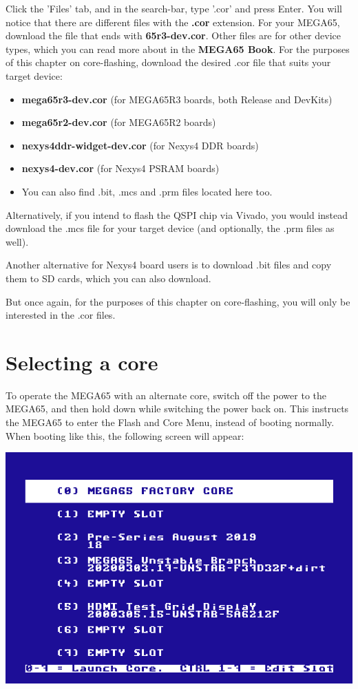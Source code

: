 Click the 'Files' tab, and in the search-bar, type '.cor' and press Enter.
\ifdefined\printmanual
  You will notice that there are different files with the {\bf .cor} extension. For your MEGA65, download the file
  that ends with {\bf 65r3-dev.cor}. Other files are for other device types, which you can read more about in the
  {\bf MEGA65 Book}.
\else
  For the purposes of this chapter on core-flashing, download the desired .cor file that suits your target device:

  \begin{itemize}
    \item{\textbf{mega65r3-dev.cor} (for MEGA65R3 boards, both Release and DevKits)}
    \item{\textbf{mega65r2-dev.cor} (for MEGA65R2 boards)}
    \item{\textbf{nexys4ddr-widget-dev.cor} (for Nexys4 DDR boards)}
    \item{\textbf{nexys4-dev.cor} (for Nexys4 PSRAM boards)}
    \item{You can also find .bit, .mcs and .prm files located here too.}
  \end{itemize}

  Alternatively, if you intend to flash the QSPI chip via Vivado, you would instead download the .mcs file for your target device (and optionally, the .prm files as well).

  Another alternative for Nexys4 board users is to download .bit files and copy them to SD cards, which you can also download.

  But once again, for the purposes of this chapter on core-flashing, you will only be interested in the .cor files.
\fi

\section{Selecting a core}

To operate the MEGA65 with an alternate core, switch off the power to the MEGA65, and then hold
 down while switching the power back on. This instructs the MEGA65 to enter the
Flash and Core Menu, instead of booting normally. When booting like this, the following screen will appear:

\begin{center}
\includegraphics[trim= 0  0 0 10mm,clip,width=0.7\linewidth]{images/ss-flashmenu.png}
\end{center}

